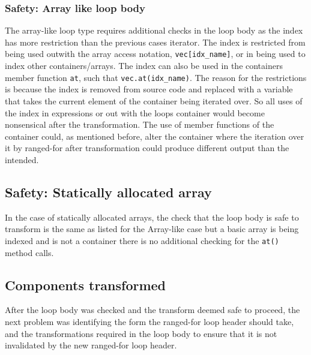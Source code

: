 \documentclass[bsc,frontabs,singlespacing,twoside,parskip,deptreport]{infthesis}
\begin{document}
\subsubsection{Safety: Array like loop body}
The array-like loop type requires additional checks in the loop body as the index has more restriction than the previous cases iterator. The index is restricted from being used outwith the array access notation, \texttt{vec[idx\_name]}, or in being used to index other containers/arrays. The index can also  be used in the containers member function \texttt{at}, such that \texttt{vec.at(idx\_name)}. The reason for the restrictions is because the index is removed from source code and replaced with a variable that takes the current element of the container being iterated over. So all uses of the index in expressions or out with the loops container would become nonsensical after the transformation. The use of member functions of the container could, as mentioned before, alter the container where the iteration over it by ranged-for after transformation could produce different output than the intended. 

\subsection{Safety: Statically allocated array }
In the case of statically allocated arrays, the check that the loop body is safe to transform is the same as listed for the Array-like case but a basic array is being indexed and is not a container there is no additional checking for the \texttt{at()} method calls.  



\subsection{Components transformed}
After the loop body was checked and the transform deemed safe to proceed, the next problem was identifying the form the ranged-for loop header should take, and the transformations required in the loop body to ensure that it is not invalidated by the new ranged-for loop header.
\end{document}
